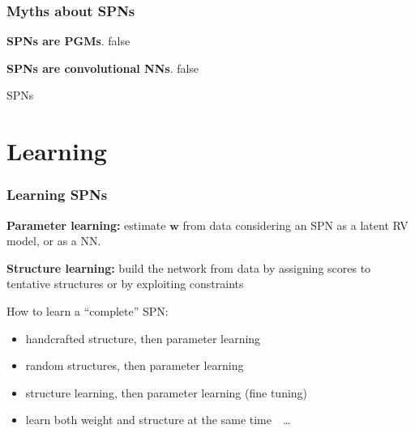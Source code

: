 \documentclass[10pt, t, xcolor={usenames,dvipsnames,svgnames}, compress]{beamer}
\begin{document}
\begin{frame}
  \frametitle{Myths about SPNs}
 \textbf{SPNs are PGMs}. false

 \textbf{SPNs are convolutional NNs}. false

  SPNs 
\end{frame}

\section{Learning}
{
  \begin{frame}[c]
    \sectionpage
  \end{frame}
}

\begin{frame}
\frametitle{Learning SPNs}
  \textbf{Parameter learning:} estimate $\mathbf{w}$ from data
  considering an SPN as a latent RV model, or as a NN.\par\bigskip

  \textbf{Structure learning:} build the network from data by assigning
  scores to tentative structures or by exploiting constraints\par\bigskip

  How to learn a ``complete'' SPN:
  \begin{itemize}
  \item handcrafted structure, then parameter learning~\parencite{Poon2011}~\parencite{Gens2012}
  \item random structures, then parameter learning~\parencite{Rashwan2016}
  \item structure learning, then parameter learning (fine tuning)~\parencite{Zhao2016a}
  \item learn both weight and structure at the same time~\parencites{Gens2013,Rooshenas2014,Vergari2015,Adel2015}~\dots  
  \end{itemize}
\end{frame}
\end{document}
